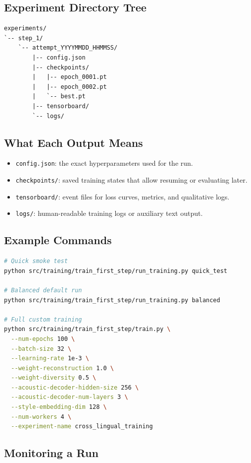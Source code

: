 \documentclass[11pt]{article}
\newcommand{\pathtt}[1]{\texttt{#1}}
\begin{document}
\subsection{Experiment Directory Tree}

\begin{lstlisting}
experiments/
`-- step_1/
    `-- attempt_YYYYMMDD_HHMMSS/
        |-- config.json
        |-- checkpoints/
        |   |-- epoch_0001.pt
        |   |-- epoch_0002.pt
        |   `-- best.pt
        |-- tensorboard/
        `-- logs/
\end{lstlisting}

\subsection{What Each Output Means}

\begin{itemize}[leftmargin=1.5em]
  \item \pathtt{config.json}: the exact hyperparameters used for the run.
  \item \pathtt{checkpoints/}: saved training states that allow resuming or evaluating later.
  \item \pathtt{tensorboard/}: event files for loss curves, metrics, and qualitative logs.
  \item \pathtt{logs/}: human-readable training logs or auxiliary text output.
\end{itemize}

\subsection{Example Commands}

\begin{lstlisting}[language=bash]
# Quick smoke test
python src/training/train_first_step/run_training.py quick_test

# Balanced default run
python src/training/train_first_step/run_training.py balanced

# Full custom training
python src/training/train_first_step/train.py \
  --num-epochs 100 \
  --batch-size 32 \
  --learning-rate 1e-3 \
  --weight-reconstruction 1.0 \
  --weight-diversity 0.5 \
  --acoustic-decoder-hidden-size 256 \
  --acoustic-decoder-num-layers 3 \
  --style-embedding-dim 128 \
  --num-workers 4 \
  --experiment-name cross_lingual_training
\end{lstlisting}

\subsection{Monitoring a Run}
\end{document}
